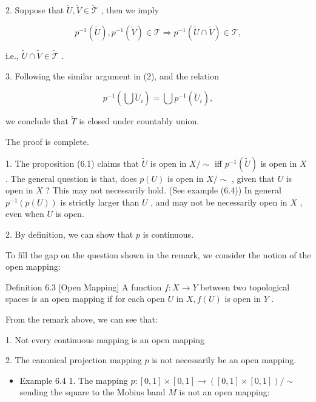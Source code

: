 2. Suppose that \(\widetilde{U},\widetilde{V} \in  \widetilde{\mathcal{T}}\) , then we imply

\[
{p}^{-1}\left( \widetilde{U}\right) ,{p}^{-1}\left( \widetilde{V}\right)  \in  \mathcal{T} \Rightarrow  {p}^{-1}\left( {\widetilde{U} \cap  \widetilde{V}}\right)  \in  \mathcal{T},
\]

i.e., \(\widetilde{U} \cap  \widetilde{V} \in  \widetilde{\mathcal{T}}\) .

3. Following the similar argument in (2), and the relation

\[
{p}^{-1}\left( {\bigcup {\widetilde{U}}_{i}}\right)  = \bigcup {p}^{-1}\left( {\widetilde{U}}_{i}\right) ,
\]

we conclude that \(\widetilde{T}\) is closed under countably union.

The proof is complete.

1. The proposition (6.1) claims that \(\widetilde{U}\) is open in \(X/ \sim\) iff \({p}^{-1}\left( \widetilde{U}\right)\) is open in \(X\) . The general question is that, does \(p\left( U\right)\) is open in \(X/ \sim\) , given that \(U\) is open in \(X\) ? This may not necessarily hold. (See example (6.4)) In general \({p}^{-1}\left( {p\left( U\right) }\right)\) is strictly larger than \(U\) , and may not be necessarily open in \(X\) , even when \(U\) is open.

2. By definition, we can show that \(p\) is continuous.

To fill the gap on the question shown in the remark, we consider the notion of the open mapping:

Definition 6.3 [Open Mapping] A function \(f : X \rightarrow  Y\) between two topological spaces is an open mapping if for each open \(U\) in \(X,f\left( U\right)\) is open in \(Y\) .

From the remark above, we can see that:

1. Not every continuous mapping is an open mapping

2. The canonical projection mapping \(p\) is not necessarily be an open mapping.

\begin{itemize}
\item Example 6.4 1. The mapping \(p : \left\lbrack  {0,1}\right\rbrack   \times  \left\lbrack  {0,1}\right\rbrack   \rightarrow  \left( {\left\lbrack  {0,1}\right\rbrack   \times  \left\lbrack  {0,1}\right\rbrack  }\right) / \sim\) sending the square to the Mobius band \(M\) is not an open mapping:
\end{itemize}

